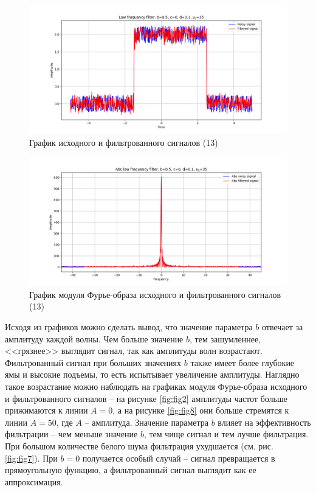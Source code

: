 \documentclass[a4paper, 12pt]{article}
\begin{document}
    \begin{figure}[!htb]
        \centering
        \includegraphics[scale=0.48]{9_u_flt_u_nohigh.png}
        \captionsetup{skip=0pt}
        \caption{График исходного и фильтрованного сигналов (13)}
        \label{fig:fig25}
    \end{figure}
    \begin{figure}[!htb]
        \centering
        \includegraphics[scale=0.48]{9_abs_u_U_nohigh.png}
        \captionsetup{skip=0pt}
        \caption{График модуля Фурье-образа исходного и фильтрованного сигналов (13)}
        \label{fig:fig26}
    \end{figure}


    Исходя из графиков можно сделать вывод, что значение параметра $b$ отвечает за амплитуду каждой волны.
    Чем больше значение $b$, тем зашумленнее, <<грязнее>> выглядит сигнал, так как амплитуды волн возрастают.
    Фильтрованный сигнал при больших значениях $b$ также имеет более глубокие ямы и высокие подъемы, то есть
    испытывает увеличение амплитуды. Наглядно такое возрастание можно наблюдать на графиках модуля Фурье-образа
    исходного и фильтрованного сигналов -- на рисунке \ref{fig:fig2} амплитуды частот больше прижимаются к линии 
    $A=0$, а на рисунке \ref{fig:fig8} они больше стремятся к линии $A=50$, где $A$ -- амплитуда. Значение
    параметра $b$ влияет на эффективность фильтрации -- чем меньше значение $b$, тем чище сигнал и тем лучше
    фильтрация. При большом количестве белого шума фильтрация ухудшается (см. рис. \ref{fig:fig7}).
    При $b=0$ получается особый случай -- сигнал превращается в прямоугольную функцию, а фильтрованный
    сигнал выглядит как ее аппроксимация.
\end{document}
